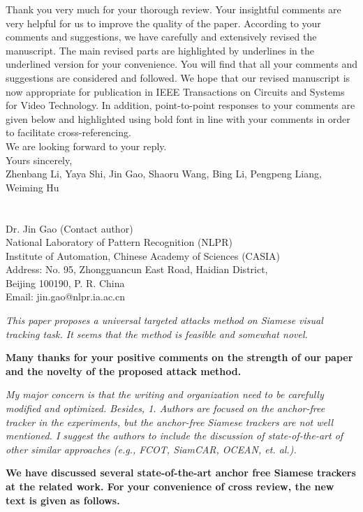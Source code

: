 \documentclass[12pt]{article}
\begin{document}
Thank you very much for your thorough review. Your insightful comments are very helpful for us to improve the quality of the paper. According to your comments and suggestions, we have carefully and extensively revised the manuscript. The main revised parts are highlighted by underlines in the underlined version for your convenience. You will find that all your comments and suggestions are considered and followed. We hope that our revised manuscript is now appropriate for publication in IEEE Transactions on Circuits and Systems for Video Technology.
In addition, point-to-point responses to your comments are given below and highlighted using bold font in line with your comments in order to facilitate cross-referencing.\\[10pt]
\indent We are looking forward to your reply.\\[10pt]
\noindent Yours sincerely,\\
\noindent Zhenbang Li, Yaya Shi, Jin Gao, Shaoru Wang, Bing Li, Pengpeng Liang, Weiming Hu
\\
\\
\\
\noindent Dr. Jin Gao (Contact author)\\
\noindent National Laboratory of Pattern Recognition (NLPR)\\
\noindent Institute of Automation, Chinese Academy of Sciences (CASIA)\\
\noindent Address: No. 95, Zhongguancun East Road, Haidian District,\\
\noindent Beijing 100190, P. R. China\\
\noindent Email: jin.gao@nlpr.ia.ac.cn

\newpage
\textit{This paper proposes a universal targeted attacks method on Siamese visual tracking task. It seems that the method is feasible and somewhat novel.}

\textbf{Many thanks for your positive comments on the strength of our paper and the novelty of the proposed attack method.}

\textit{My major concern is that the writing and organization need to be carefully modified and optimized. Besides, 1. Authors are focused on the anchor-free tracker in the experiments, but the anchor-free Siamese trackers are not well mentioned. I suggest the authors to include the discussion of state-of-the-art of other similar approaches (e.g., FCOT, SiamCAR, OCEAN, et. al.).}

\textbf{We have discussed several state-of-the-art anchor free Siamese trackers at the related work. For your convenience of cross review, the new text is given as follows.}
\end{document}
